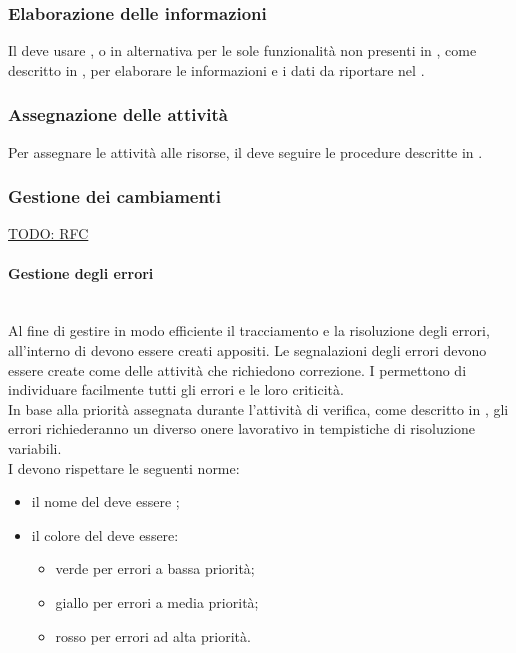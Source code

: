 \subsubsection{Elaborazione delle informazioni}
Il \Responsabile{} deve usare , o in alternativa  per le sole funzionalità non presenti in , come descritto in , per elaborare le informazioni e i dati da riportare nel \PianoDiProgetto.

\subsubsection{Assegnazione delle attività}
Per assegnare le attività alle risorse, il \Responsabile{} deve seguire le procedure descritte in .

\subsubsection{Gestione dei cambiamenti}
\underline{TODO: RFC}

\paragraph{Gestione degli errori} \mbox{} \\
Al fine di gestire in modo efficiente il tracciamento e la risoluzione degli errori, all'interno di  devono essere creati  appositi.
Le segnalazioni degli errori devono essere create come  delle attività che richiedono correzione. I  permettono di individuare facilmente tutti gli errori e le loro criticità.\\
In base alla priorità assegnata durante l'attività di verifica, come descritto in \PianoDiQualifica, gli errori richiederanno un diverso onere lavorativo in tempistiche di risoluzione variabili.\\
I  devono rispettare le seguenti norme:
\begin{itemize}
	\item il nome del  deve essere ;
	\item il colore del  deve essere:
	\begin{itemize}
		\item verde per errori a bassa priorità;
		\item giallo per errori a media priorità;
		\item rosso per errori ad alta priorità.
	\end{itemize}
\end{itemize}


